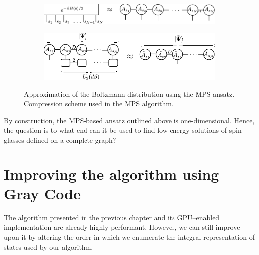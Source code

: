 \begin{figure}
  \begin{subfigure}[t]{0.45\textwidth}
    \caption{}\label{fig:mps:boltzmann}
    \includegraphics[width=\textwidth]{figures/mps}
  \end{subfigure}\hfill
  \begin{subfigure}[t]{0.45\textwidth}
    \caption{}\label{fig:mps:compress}
    \includegraphics[width=\textwidth]{figures/mps_compress}
  \end{subfigure}
  \caption{ Approximation of the Boltzmann distribution using the MPS ansatz.  Compression scheme used in the MPS algorithm.}
  \label{fig:mps}
\end{figure}


By construction, the MPS-based ansatz outlined above is one-dimensional. Hence,
the question is to what end can it be used to find low energy solutions of spin-glasses
defined on a complete graph?

\section{Improving the algorithm using Gray Code}

The algorithm presented in the previous chapter and its GPU--enabled
implementation are already highly performant. However, we can still improve
upon it by altering the order in which we enumerate the integral representation
of states used by our algorithm.


